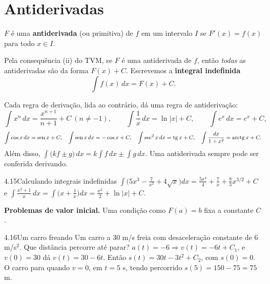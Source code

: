 \section{Antiderivadas}

\begin{definicao}
$F$ é uma \textbf{antiderivada} (ou primitiva) de $f$ em um intervalo $I$ se $F'(x)=f(x)$ para
todo $x\in I$.
\end{definicao}

Pela consequência (ii) do TVM, se $F$ é uma antiderivada de $f$, então \emph{todas} as
antiderivadas são da forma $F(x)+C$. Escrevemos a \textbf{integral indefinida}
\[
\int f(x)\,dx=F(x)+C .
\]


Cada regra de derivação, lida ao contrário, dá uma regra de antiderivação:
\[
\int x^n\,dx=\frac{x^{n+1}}{n+1}+C\ (n\neq-1),\qquad
\int\frac1x\,dx=\ln|x|+C,\qquad \int e^x\,dx=e^x+C,
\]
\[
\int\cos x\,dx=\operatorname{sen} x+C,\quad \int\operatorname{sen} x\,dx=-\cos x+C,\quad \int\sec^2x\,dx=\operatorname{tg} x+C,\quad
\int\frac{dx}{1+x^2}=\operatorname{arctg} x+C .
\]
Além disso, $\int\big(kf\pm g\big)\,dx=k\int f\,dx\pm\int g\,dx$. Uma antiderivada sempre pode
ser conferida derivando.

\begin{exemplo}{4.15}{Calculando integrais indefinidas}
$\displaystyle\int\Big(5x^3-\frac{7}{x^2}+4\sqrt x\Big)dx
=\frac{5x^4}4+\frac7x+\frac{8}{3}x^{3/2}+C$
\quad e\quad
$\displaystyle\int\frac{x^2+1}{x}\,dx=\int\Big(x+\frac1x\Big)dx=\frac{x^2}2+\ln|x|+C$.
\end{exemplo}

\textbf{Problemas de valor inicial.} Uma condição como $F(a)=b$ fixa a constante $C$.

\begin{exemplo}{4.16}{Um carro freando}
Um carro a 30 m/s freia com desaceleração constante de 6 m/s$^2$. Que distância percorre até
parar?
\solucao
$a(t)=-6\Rightarrow v(t)=-6t+C_1$, e $v(0)=30$ dá $v(t)=30-6t$. Então
$s(t)=30t-3t^2+C_2$, com $s(0)=0$. O carro para quando $v=0$, em $t=5$ s, tendo percorrido
$s(5)=150-75=75$ m.
\end{exemplo}

